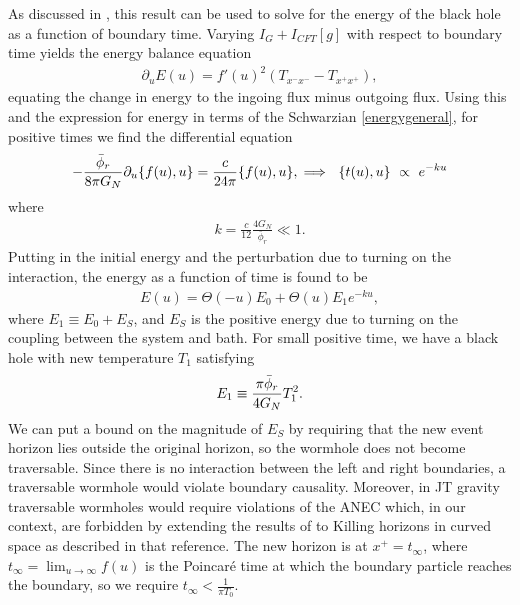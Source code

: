 \documentclass[12pt]{article}
\begin{document}
As discussed in \cite{Engelsoy:2016xyb}, this result can be used to solve for the energy of the black hole as a function of boundary time. Varying $I_G + I_{CFT}[g]$ with respect to boundary time yields the energy balance equation
\begin{align}
\partial_u E(u) = f'(u)^2  \left(T_{x^- x^-} - T_{x^+ x^+}\right),
\end{align}
equating the change in energy to the ingoing flux minus outgoing flux. Using this and the expression for energy in terms of the Schwarzian \eqref{energygeneral}, for positive times we find the differential equation
\begin{align}
- {\bar{\phi}_r \over 8 \pi G_N} \partial_u \{ f(u), u \} = {c \over 24 \pi} \{ f(u), u \}, \implies \ \{ t(u), u \} \ \propto \ e^{- k u }
\end{align}
where
\begin{align}
k =    \frac{c}{12} \frac{4G_N}{\bar{\phi}_r} \ll 1.
\end{align}
Putting in the initial energy and the perturbation due to turning on the interaction, the energy as a function of time is found to be
\begin{align}
E(u) =  \Theta(- u) E_0 + \Theta(u) E_1 e^{- k u },
\end{align}
where $E_1 \equiv E_0 + E_S$, and $E_S$ is the positive energy due to turning on the coupling between the system and bath. For small positive time, we have a black hole with new temperature $T_1$ satisfying
\begin{align}
E_1 \equiv {\pi \bar{\phi}_r \over 4 G_N} {T_1^2}.
\end{align}
We can put a bound on the magnitude of $E_S$ by requiring that the new event horizon lies outside the original horizon, so the wormhole does not become traversable.  Since there is no interaction between the left and right boundaries, a traversable wormhole would violate boundary causality.  Moreover, in JT gravity traversable wormholes would require violations of the ANEC \cite{Maldacena:2018lmt,Galloway:2018dak} which, in our context, are forbidden by extending the results of \cite{Faulkner:2016mzt} to Killing horizons in curved space as described in that reference. The new horizon is at $x^+=t_\infty$, where $t_\infty= \lim_{u\to\infty} f(u)$ is the Poincar\'e time at which the boundary particle reaches the boundary, so we require $t_\infty<\frac{1}{\pi T_0}$.
\end{document}
